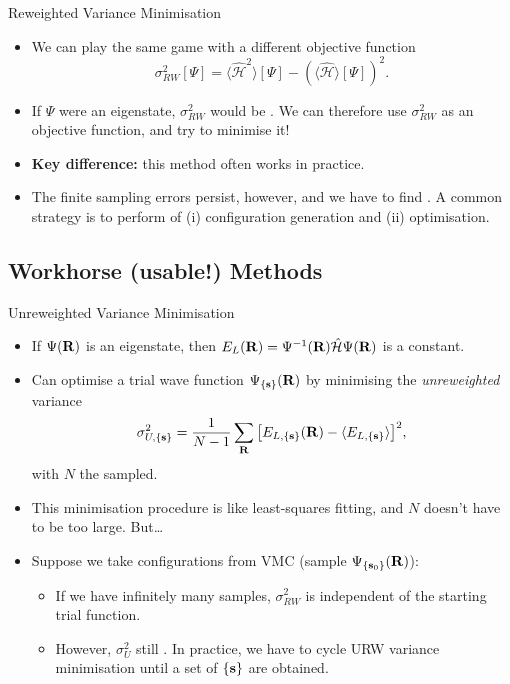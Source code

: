 \documentclass[12pt, pdf, hyperref={draft}, usenames, dvipsnames,
aspectratio=169]{beamer}
\newcommand{\expt}[1]{\langle{#1}\rangle}
\newcommand{\red}[1]{{\bf\color{LancsRed}{#1}}}
\newcommand{\blue}[1]{{\bf\color{NavyBlue}{#1}}}
\newcommand{\green}[1]{{\bf\color{ForestGreen}{#1}}}
\begin{document}
\begin{frame}{Reweighted Variance Minimisation}
\begin{itemize}
  \item We can play the same game with a different objective function
  \begin{equation}
    \sigma^{2}_{RW}[\Psi] = \expt{\mathcal{\hat H}^2}[\Psi] -
    {(\expt{\mathcal{\hat H}}[\Psi])}^2.
  \end{equation}
  \item If $\Psi$ were an eigenstate, $\sigma^2_{RW}$ would be \green{zero}.
  We can therefore use $\sigma^2_{RW}$ as an objective function, and try to minimise
  it!
  \item \textbf{Key difference:} this method often works in practice.
  \item The finite sampling errors persist, however, and we have to find \blue{ways
  to mitigate them}. A common strategy is to perform \green{multiple cycles} of (i)
  configuration generation and (ii) optimisation.
\end{itemize}
\end{frame}

\subsection{Workhorse (usable!)  Methods}\label{sub:workhorse_methods}


\begin{frame}{Unreweighted Variance Minimisation}
\begin{itemize}
  \item If $\Psi({\bf R})$ is an eigenstate, then $E_L({\bf R}) = \Psi^{-1}({\bf
  R})\mathcal{\hat H}\Psi({\bf R})$ is a constant.
  \item Can optimise a trial wave function $\Psi_{\{ {\bf s} \}}({\bf R})$  by
  minimising the \textit{unreweighted} variance
  \begin{equation}
    \sigma^2_{U,\{{\bf s}\}} = \dfrac{1}{N - 1} \sum_{\bf R} {\left[ E_{L,\{ {\bf s}
    \}}({\bf R}) - \expt{E_{L,\{{\bf s}\}}}  \right]}^2,
  \end{equation}
  with $N$ the \blue{number of configurations} sampled.
  \item This minimisation procedure is like least-squares fitting, and $N$
  doesn't have to be too large. But\ldots
  \item Suppose we take configurations from VMC (sample $\Psi_{\{{\bf s}_0\}}({\bf
  R})$):
  \begin{itemize}
    \item If we have infinitely many samples, $\sigma^2_{RW}$ is independent of
    the starting trial function.
    \item However, $\sigma^2_{U}$ still \red{depends on $\{ {\bf s}_0 \}$}. In practice, we
    have to cycle URW variance minimisation until a \green{self-consistent} set of $\{
      {\bf s}\}$ are obtained.
  \end{itemize}
\end{itemize}
\end{frame}
\end{document}
